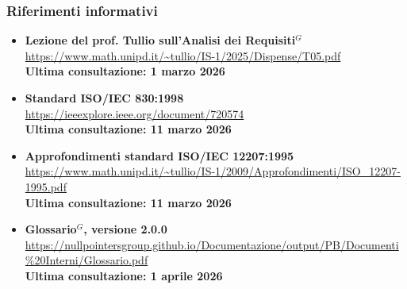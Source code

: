 	\subsubsection{Riferimenti informativi}
	\begin{itemize}[itemsep=5pt, parsep=5pt, label=$\scriptstyle\bullet$]
	
	\item \textbf{Lezione del prof. Tullio sull'Analisi dei Requisiti$^G$} \\
	\url{https://www.math.unipd.it/~tullio/IS-1/2025/Dispense/T05.pdf}\\[3pt]
	\textbf{Ultima consultazione: 1 marzo 2026}
	
	\item \textbf{Standard ISO/IEC 830:1998} \\
	\url{https://ieeexplore.ieee.org/document/720574} \\[3pt]
	\textbf{Ultima consultazione: 11 marzo 2026}
	
	\item \textbf{Approfondimenti standard ISO/IEC 12207:1995} \\
	\url{https://www.math.unipd.it/~tullio/IS-1/2009/Approfondimenti/ISO_12207-1995.pdf} \\[3pt]
	\textbf{Ultima consultazione: 11 marzo 2026}
    
    \item \textbf{Glossario$^G$, versione 2.0.0} \\
    \url{https://nullpointersgroup.github.io/Documentazione/output/PB/Documenti%20Interni/Glossario.pdf}\\[3pt]
    \textbf{Ultima consultazione: 1 aprile 2026}
    
	\end{itemize}
